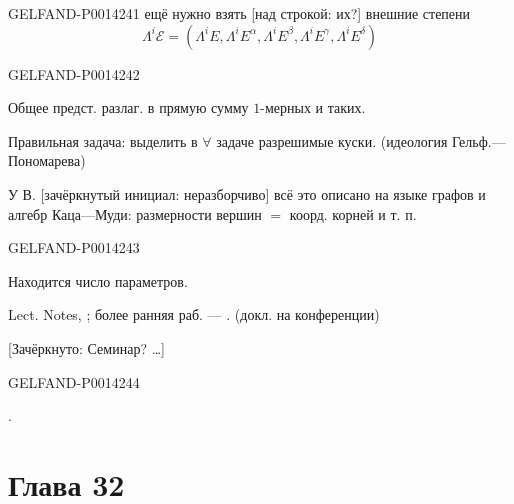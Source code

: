 \begin{GelfandAdjacentEvidence}{GELFAND-P001424}{1}
ещё нужно взять [над строкой: их?] внешние степени
\[
\Lambda^i\mathcal E=
(\Lambda^i E,\Lambda^i E^\alpha,\Lambda^i E^\beta,
 \Lambda^i E^\gamma,\Lambda^i E^\delta)
\]
\end{GelfandAdjacentEvidence}
\begin{GelfandAdjacentEvidence}{GELFAND-P001424}{2}

Общее предст. разлаг. в прямую сумму \(1\)-мерных и таких.

Правильная задача: выделить в \(\forall\) задаче разрешимые куски. (идеология Гельф.—Пономарева)

У В. [зачёркнутый инициал: неразборчиво]  всё это описано на языке графов и алгебр
Каца—Муди:
размерности вершин \(=\) коорд. корней и т. п.
\end{GelfandAdjacentEvidence}
\begin{GelfandAdjacentEvidence}{GELFAND-P001424}{3}


Находится число параметров.

Lect. Notes, ; более ранняя раб. — .
(докл. на конференции)

[Зачёркнуто: Семинар? \ldots]
\end{GelfandAdjacentEvidence}
\begin{GelfandAdjacentEvidence}{GELFAND-P001424}{4}

\end{GelfandAdjacentEvidence}


\quad {}.



\clearpage{}
\section*{Глава 32}


